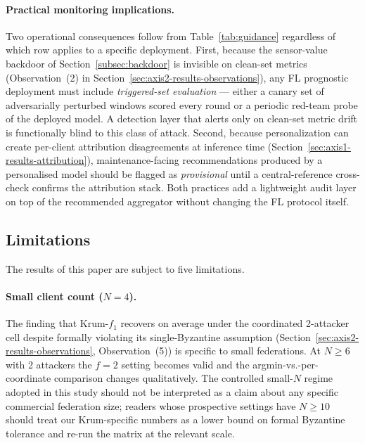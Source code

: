 \documentclass[preprint,12pt,authoryear]{elsarticle}
\begin{document}
\paragraph{Practical monitoring implications.}
Two operational consequences follow from Table~\ref{tab:guidance}
regardless of which row applies to a specific deployment. First,
because the sensor-value backdoor of Section~\ref{subsec:backdoor}
is invisible on clean-set metrics (Observation~(2) in
Section~\ref{sec:axis2-results-observations}), any FL prognostic
deployment must include \emph{triggered-set evaluation} --- either
a canary set of adversarially perturbed windows scored every round
or a periodic red-team probe of the deployed model. A detection
layer that alerts only on clean-set metric drift is functionally
blind to this class of attack. Second, because personalization can
create per-client attribution disagreements at inference time
(Section~\ref{sec:axis1-results-attribution}), maintenance-facing
recommendations produced by a personalised model should be flagged
as \emph{provisional} until a central-reference cross-check
confirms the attribution stack. Both practices add a lightweight
audit layer on top of the recommended aggregator without changing
the FL protocol itself.

\subsection{Limitations}
\label{sec:discuss-limitations}

The results of this paper are subject to five limitations.

\paragraph{Small client count ($N = 4$).}
The finding that Krum-$f_1$ recovers on average under the
coordinated 2-attacker cell despite formally violating its
single-Byzantine assumption
(Section~\ref{sec:axis2-results-observations}, Observation~(5)) is
specific to small federations. At $N \geq 6$ with 2 attackers the
$f = 2$ setting becomes valid and the argmin-vs.-per-coordinate
comparison changes qualitatively. The controlled small-$N$ regime
adopted in this study should not be interpreted as a claim about
any specific commercial federation size; readers whose prospective
settings have $N \geq 10$ should treat our Krum-specific numbers
as a lower bound on formal Byzantine tolerance and re-run the
matrix at the relevant scale.
\end{document}
